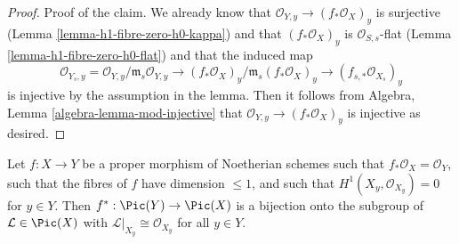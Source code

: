 \begin{proof}
\medskip\noindent
Proof of the claim. We already know that
$\mathcal{O}_{Y, y} \longrightarrow (f_*\mathcal{O}_X)_y$
is surjective (Lemma \ref{lemma-h1-fibre-zero-h0-kappa})
and that $(f_*\mathcal{O}_X)_y$ is
$\mathcal{O}_{S, s}$-flat (Lemma \ref{lemma-h1-fibre-zero-h0-flat})
and that the induced map
$$
\mathcal{O}_{Y_s, y} =  \mathcal{O}_{Y, y}/\mathfrak m_s\mathcal{O}_{Y, y}
\longrightarrow
(f_*\mathcal{O}_X)_y/\mathfrak m_s (f_*\mathcal{O}_X)_y
\to
(f_{s, *}\mathcal{O}_{X_s})_y
$$
is injective by the assumption in the lemma. Then it follows from
Algebra, Lemma \ref{algebra-lemma-mod-injective}
that $\mathcal{O}_{Y, y} \longrightarrow (f_*\mathcal{O}_X)_y$
is injective as desired.
\end{proof}

\begin{lemma}
\label{lemma-bijection-on-Pic}
Let $f : X \to Y$ be a proper morphism of Noetherian schemes
such that $f_*\mathcal{O}_X = \mathcal{O}_Y$, such that
the fibres of $f$ have dimension $\leq 1$, and such that
$H^1(X_y, \mathcal{O}_{X_y}) = 0$ for $y \in Y$.
Then $f^* : \Pic(Y) \to \Pic(X)$ is a bijection onto
the subgroup of $\mathcal{L} \in \Pic(X)$ with
$\mathcal{L}|_{X_y} \cong \mathcal{O}_{X_y}$
for all $y \in Y$.
\end{lemma}

